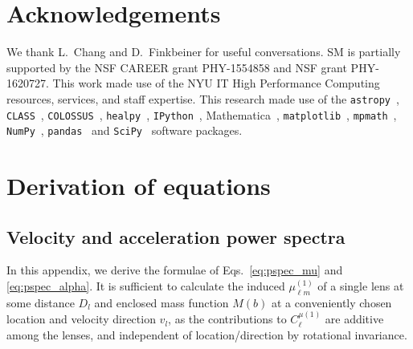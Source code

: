 \documentclass[prd,aps,10pt,nofootinbib,twocolumn,superscriptaddress,preprintnumbers,balancelastpage,longbibliography]{revtex4-1}
\begin{document}
\clearpage
\section*{Acknowledgements}
We thank L.~Chang and D.~Finkbeiner for useful conversations. SM is partially supported by the NSF CAREER grant PHY-1554858 and NSF grant PHY-1620727. This work made use of the NYU IT High Performance Computing resources, services, and staff expertise.
 This research made use of the \texttt{astropy}~\cite{2013A&A...558A..33A,2018AJ....156..123A}, \texttt{CLASS}~\cite{Blas:2011rf}, \texttt{COLOSSUS}~\cite{2018ApJS..239...35D}, \texttt{healpy}~\cite{2005ApJ...622..759G}, \texttt{IPython}~\cite{PER-GRA:2007}, Mathematica~\cite{Mathematica}, \texttt{matplotlib}~\cite{Hunter:2007}, \texttt{mpmath}~\cite{mpmath}, \texttt{NumPy}~\cite{numpy:2011}, \texttt{pandas}~\cite{pandas:2010} and \texttt{SciPy}~\cite{Jones:2001ab} software packages. 

\appendix 

\section{Derivation of equations}
\label{app:derivations}

\subsection{Velocity and acceleration power spectra}
In this appendix, we derive the formulae of Eqs.~\ref{eq:pspec_mu} and \ref{eq:pspec_alpha}. It is sufficient to calculate the induced $\mu_{\ell m}^{(1)}$ of a single lens at some distance $D_l$ and enclosed mass function $M(b)$ at a conveniently chosen location and velocity direction $\hat{v}_l$, as the contributions to $C^{\mu(1)}_\ell$ are additive among the lenses, and independent of location/direction by rotational invariance.
\end{document}
